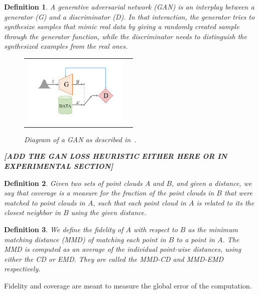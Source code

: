 \documentclass[12pt]{article}
\newtheorem{definition}{Definition}
\begin{document}
    \begin{definition}
        \normalfont
        A \emph{generative adversarial network} (GAN) is an interplay between a \emph{generator} (G) and a \emph{discriminator} (D).
        In that interaction, the generator tries to synthesize samples that mimic real data by giving a randomly created sample through the generator function, while the discriminator needs to distinguish the synthesized examples from the real ones.

        \begin{figure}[H]
            \centering
            \begin{tabular}{cc}
                \includegraphics[width = 50mm]{gan}
            \end{tabular}
            \caption{Diagram of a GAN as described in~\cite{pmlr-v80-achlioptas18a}.}
        \end{figure}

        \textbf{[ADD THE GAN LOSS HEURISTIC EITHER HERE OR IN EXPERIMENTAL SECTION]}

    \end{definition}

    \begin{definition}
        \normalfont
        Given two sets of point clouds $A$ and $B$, and given a distance, we say that \emph{coverage} is a measure for the fraction of the point clouds in $B$ that were matched to point clouds in $A$, such that each point cloud in $A$ is related to its the closest neighbor in $B$ using the given distance.
    \end{definition}

    \begin{definition}
        \normalfont
        We define the \emph{fidelity} of $A$ with respect to $B$ as the \emph{minimum matching distance} (MMD) of matching each point in $B$ to a point in $A$.
        The \emph{MMD} is computed as an average of the individual point-wise distances, using either the CD or EMD.
        They are called the \emph{MMD-CD} and \emph{MMD-EMD} respectively.
    \end{definition}

    Fidelity and coverage are meant to measure the global error of the computation.
\end{document}
